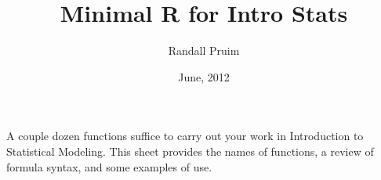 \documentclass{report}\usepackage{graphicx, color}
\title{Minimal R for Intro Stats}
\author{
Randall Pruim
}
\date{June, 2012}
\begin{document}
\parindent=0pt














\let\oldchapter=\chapter
\def\chapter{\setcounter{page}{1}\oldchapter}



\def\opt#1{#1}
\def\squeeze{\vspace*{-4ex}}
A couple dozen functions suffice to carry out your work in Introduction to Statistical Modeling.  This sheet provides the names of functions, a review of formula syntax, and some examples of use.
\end{document}
